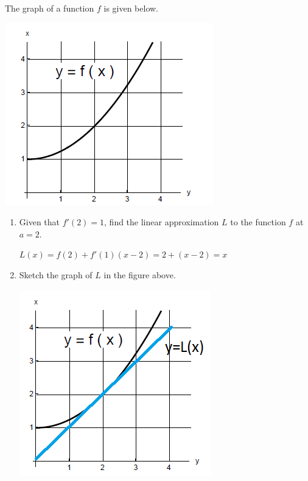 \documentclass[nooutcomes,handout]{ximera}
\begin{document}
\begin{problem}
The graph of a function $f$ is given below.
    \begin{image}
      \includegraphics[scale = .7]{figure3.png}
    \end{image}
\begin{enumerate}

\item Given that $f'(2)=1$, find the linear approximation $L$ to the function $f$ at $a=2$.

\begin{freeResponse}
$L(x)=f(2)+f'(1)(x-2)=2+(x-2)=x$
\end{freeResponse}

\item Sketch the graph of $L$ in the figure above.
\begin{freeResponse}
    \begin{image}
      \includegraphics[scale = .7]{figure4.png}
    \end{image}
\end{freeResponse}


\end{enumerate}
\end{problem}
\end{document}
